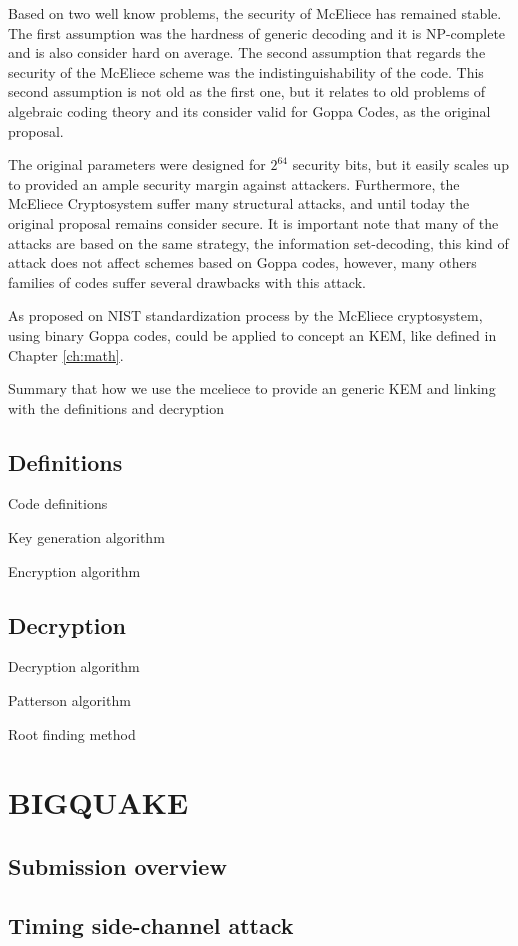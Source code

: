 Based on two well know problems, the security of McEliece has remained stable. The first assumption was the hardness of generic decoding and it is NP-complete and is also consider hard on average. The second assumption that regards the security of the McEliece scheme was the indistinguishability of the code. This second assumption is not old as the first one, but it relates to old problems of algebraic coding theory and its consider valid for Goppa Codes, as the original proposal. 

The original parameters were designed for $2^{64}$ security bits, but it easily scales up to provided an ample security margin against attackers. Furthermore, the McEliece Cryptosystem suffer many structural attacks, and until today the original proposal remains consider secure. It is important note that many of the attacks are based on the same strategy, the information set-decoding, this kind of attack does not affect schemes based on Goppa codes, however, many others families of codes suffer several drawbacks with this attack. 

As proposed on NIST standardization process by \cite{classial, bigquake, others} the McEliece cryptosystem, using binary Goppa codes, could be applied to concept an KEM, like defined in Chapter \ref{ch:math}. 

Summary that how we use the mceliece to provide an generic KEM and linking with the definitions and decryption

\subsection{Definitions}
Code definitions

Key generation algorithm

Encryption algorithm

\subsection{Decryption}
Decryption algorithm

Patterson algorithm

Root finding method


\section{BIGQUAKE}
\subsection{Submission overview}
\subsection{Timing side-channel attack}